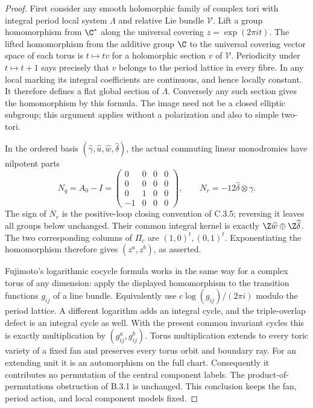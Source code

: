 \begin{proof}
First consider any smooth holomorphic family of
complex tori with integral period local system
$\Lambda$ and relative Lie bundle $\mathcal V$.
Lift a group homomorphism from $\C^*$ along the
universal covering $z=\exp(2\pi i t)$.
The lifted homomorphism from the additive group
$\C$ to the universal covering vector space of
each torus is $t\mapsto t v$ for a holomorphic
section $v$ of $\mathcal V$.  Periodicity under
$t\mapsto t+1$ says precisely that $v$ belongs
to the period lattice in every fibre.  In any
local marking its integral coefficients are
continuous, and hence locally constant.  It
therefore defines a flat global section of
$\Lambda$.  Conversely any such section gives
the homomorphism by this formula.  The image
need not be a closed elliptic subgroup; this
argument applies without a polarization and
also to simple two-tori.

In the ordered basis
$(\widehat\gamma,\widehat u,\widehat w,\widehat\delta)$,
the actual commuting linear monodromies have
nilpotent parts
\[
 N_q=A_0-I=
 \begin{pmatrix}
 0&0&0&0\\0&0&0&0\\0&1&0&0\\-1&0&0&0
 \end{pmatrix},\qquad
 N_r=-12\widehat\delta\otimes\gamma.
\]
The sign of $N_r$ is the positive-loop closing
convention of C.3.5; reversing it leaves all
groups below unchanged.  Their common integral
kernel is exactly $\Z\widehat w\oplus\Z\widehat\delta$.
The two corresponding columns of $\Pi_c$ are
$(1,0)^t,(0,1)^t$.  Exponentiating the homomorphism
therefore gives $(z^a,z^b)$, as asserted.

Fujimoto's logarithmic cocycle formula
\citep[Definition 1.1]{Fujimoto1990AB} works in
the same way for a complex torus of any dimension:
apply the displayed homomorphism to the transition
functions $g_{ij}$ of a line bundle.  Equivalently
use $c\log(g_{ij})/(2\pi i)$ modulo the period
lattice.  A different logarithm adds an integral
cycle, and the triple-overlap defect is an
integral cycle as well.  With the present common
invariant cycles this is exactly multiplication
by $(g_{ij}^a,g_{ij}^b)$.  Torus multiplication
extends to every toric variety of a fixed fan
and preserves every torus orbit and boundary
ray.  For an extending unit it is an automorphism
on the full chart.  Consequently it contributes
no permutation of the central component labels.
The product-of-permutations obstruction of B.3.1
is unchanged.  This conclusion keeps the fan,
period action, and local component models fixed.


\end{proof}
